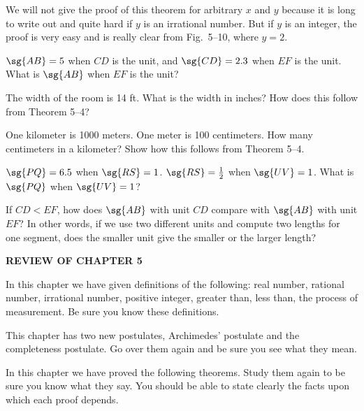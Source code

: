 \documentclass[11pt]{book}
\theoremstyle{bkplain}
\newcommand{\Vhead}[1]{%
  \par\bigskip\begin{center}\bfseries\large\MakeUppercase{#1}\end{center}%
  \par\nopagebreak\medskip}
\theoremstyle{XIplainnote}
\theoremstyle{bkplain}
\theoremstyle{bkplain}
\begin{document}
We will not give the proof of this theorem for arbitrary $x$ and $y$ because it
is long to write out and quite hard if $y$ is an irrational number. But if $y$
is an integer, the proof is very easy and is really clear from Fig.~5--10,
where $y = 2$.


\begin{exercisecols}
\begin{exlist}
\item $\sg{AB} = 5$ when $CD$ is the unit, and $\sg{CD} = 2.3$ when $EF$ is the
      unit. What is $\sg{AB}$ when $EF$ is the unit?
\item The width of the room is 14 ft. What is the width in inches? How does
      this follow from Theorem 5--4?
\item One kilometer is 1000 meters. One meter is 100 centimeters. How many
      centimeters in a kilometer? Show how this follows from Theorem 5--4.
\item $\sg{PQ} = 6.5$ when $\sg{RS} = 1$. $\sg{RS} = \frac{1}{2}$ when
      $\sg{UV} = 1$. What is $\sg{PQ}$ when $\sg{UV} = 1$?
\item If $CD < EF$, how does $\sg{AB}$ with unit $CD$ compare with $\sg{AB}$
      with unit $EF$? In other words, if we use two different units and compute
      two lengths for one segment, does the smaller unit give the smaller or
      the larger length?
\end{exlist}

\Vhead{Review of Chapter 5}

\begin{exlist}
\item In this chapter we have given definitions of the following: real number,
      rational number, irrational number, positive integer, greater than, less
      than, the process of measurement. Be sure you know these definitions.
\item This chapter has two new postulates, Archimedes' postulate and the
      completeness postulate. Go over them again and be sure you see what they
      mean.
\item In this chapter we have proved the following theorems. Study them again
      to be sure you know what they say. You should be able to state clearly
      the facts upon which each proof depends.
\end{exlist}


\end{exercisecols}
\end{document}
